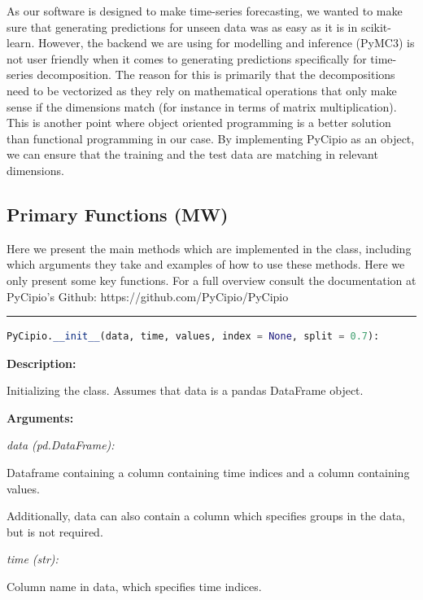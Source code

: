 \documentclass{article}
\begin{document}
\noindent As our software is designed to make time-series forecasting, we wanted to make sure that generating predictions for unseen data was as easy as it is in scikit-learn. However, the backend we are using for modelling and inference (PyMC3) is not user friendly when it comes to generating predictions specifically for time-series decomposition. The reason for this is primarily that the decompositions need to be vectorized as they rely on mathematical operations that only make sense if the dimensions match (for instance in terms of matrix multiplication). This is another point where object oriented programming is a better solution than functional programming in our case. By implementing PyCipio as an object, we can ensure that the training and the test data are matching in relevant dimensions. 

\subsection{Primary Functions (MW)}

\noindent Here we present the main methods which are implemented in the class, including which arguments they take and examples of how to use these methods. Here we only present some key functions. For a full overview consult the documentation at PyCipio’s Github: https://github.com/PyCipio/PyCipio

\vspace{5mm}

\hrule

\begin{lstlisting}[language=Python]
PyCipio.__init__(data, time, values, index = None, split = 0.7):
\end{lstlisting}

\indent \textbf{Description:} 

\indent \indent Initializing the class. Assumes that data is a pandas DataFrame object.

\indent \textbf{Arguments:}

\indent \indent \textit{data (pd.DataFrame):} 

\indent \indent \indent Dataframe containing a column containing time indices and a column containing values. 

\indent \indent \indent Additionally, data can also contain a column which specifies groups in the data, but is not required. 

\indent \indent \textit{time (str):} 

\indent \indent \indent Column name in data, which specifies time indices.
\end{document}
